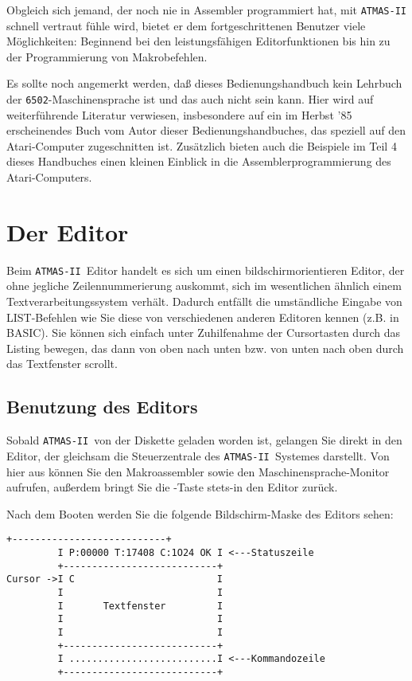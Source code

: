 \documentclass[10pt,a4paper,twoside,final,openright,titlepage]{memoir}
\def\atmas{\texttt{AT\-MAS-II }}
\newcommand{\key}[1]{\keystroke{\tiny #1}}
\begin{document}
Obgleich sich jemand, der noch nie in Assembler
programmiert hat, mit \atmas schnell vertraut fühle
wird, bietet er dem fortgeschrittenen Benutzer viele
Möglichkeiten: Beginnend bei den leistungsfähigen
Editorfunktionen bis hin zu der Programmierung von
Makrobefehlen.

Es sollte noch angemerkt werden, daß dieses
Bedienungshandbuch kein Lehrbuch der \texttt{6502}-Maschinensprache ist und das auch nicht sein kann.
Hier wird auf weiterführende Literatur verwiesen,
insbesondere auf ein im Herbst '85
erscheinendes Buch vom Autor dieser Bedienungshandbuches, das speziell auf den Atari-Computer
zugeschnitten ist. Zusätzlich bieten auch die
Beispiele im Teil 4 dieses Handbuches einen kleinen
Einblick in die Assemblerprogrammierung des
Atari-Computers.

\chapter{Der Editor}

Beim \atmas Editor handelt es sich um einen bildschirmorientieren
Editor, der ohne jegliche
Zeilennummerierung auskommt, sich im wesentlichen
ähnlich einem Textverarbeitungssystem verhält.
Dadurch entfällt die umständliche Eingabe von LIST-Befehlen
wie Sie diese von verschiedenen anderen
Editoren kennen (z.B. in BASIC). Sie können sich
einfach unter Zuhilfenahme der Cursortasten durch das
Listing bewegen, das dann von oben nach unten bzw. von
unten nach oben durch das Textfenster scrollt.

\section{Benutzung des Editors}

Sobald \atmas von der Diskette geladen worden ist,
gelangen Sie direkt in den Editor, der gleichsam die
Steuerzentrale des \atmas Systemes darstellt. Von
hier aus können Sie den Makroassembler sowie den
Maschinensprache-Monitor aufrufen, außerdem bringt Sie
die \key{RESET}-Taste stets-in den Editor zurück.

Nach dem Booten werden Sie die folgende Bildschirm-Maske
des Editors sehen:

\begin{Verbatim}[samepage=true]
         +---------------------------+
         I P:00000 T:17408 C:1O24 OK I <---Statuszeile
         +---------------------------+
Cursor ->I C                         I
         I                           I
         I       Textfenster         I
         I                           I
         I                           I
         +---------------------------+
         I ..........................I <---Kommandozeile
         +---------------------------+
\end{Verbatim}
\end{document}
